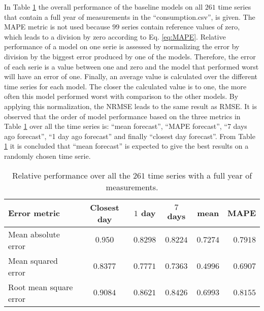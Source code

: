 In Table \ref{tab:summ_data_rel_performance} the overall performance of the baseline models on all $ 261 $ time series that contain a full year of measurements in the ``consumption.csv'', is given. The MAPE metric is not used because $ 99 $ series contain reference values of zero, which leads to a division by zero according to Eq. \ref{eq:MAPE}. Relative performance of a model on one serie is assessed by normalizing the error by division by the biggest error produced by one of the models. Therefore, the error of each serie is a value between one and zero and the model that performed worst will have an error of one. Finally, an average value is calculated over the different time series for each model. The closer the calculated value is to one, the more often this model performed worst with comparison to the other models. By applying this normalization, the NRMSE leads to the same result as RMSE. It is observed that the order of model performance based on the three metrics in Table \ref{tab:summ_data_rel_performance} over all the time series is: ``mean forecast'', ``MAPE forecast'', ``7 days ago forecast'', ``1 day ago forecast'' and finally ``closest day forecast''. From Table \ref{tab:summ_data_rel_performance} it is concluded that ``mean forecast'' is expected to give the best results on a randomly chosen time serie.

\begin{table}[ht]
	\centering
	\begin{tabular}{@{}l|ccccr@{}} \toprule
		\textbf{Error metric}	& \textbf{Closest day} & \textbf{$ 1 $ day} & \textbf{$ 7 $ days} & \textbf{mean} & \textbf{MAPE}\\\midrule
		Mean absolute error& \cellcolor{red!25}$0.950 $&$ 0.8298 $  & $0.8224 $ & \cellcolor{green!25}$ 0.7274 $ & $ 0.7918 $\\
		Mean squared error& \cellcolor{red!25}$0.8377 $&$ 0.7771 $  & $0.7363 $ & \cellcolor{green!25}$ 0.4996 $ & $ 0.6907 $\\
		Root mean square error& \cellcolor{red!25}$0.9084 $&$ 0.8621$  & $0.8426$ & \cellcolor{green!25}$ 0.6993$ & $ 0.8155$\\\bottomrule
	\end{tabular}
	\caption{Relative performance over all the $ 261 $ time series with a full year of measurements.}
	\label{tab:summ_data_rel_performance}
\end{table}


